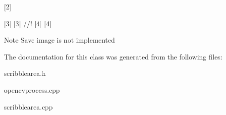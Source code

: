 \mbox{[}2\mbox{]} 

\mbox{[}3\mbox{]} \mbox{[}3\mbox{]} //! \mbox{[}4\mbox{]} \mbox{[}4\mbox{]} \begin{DoxyNote}{Note}
Save image is not implemented 
\end{DoxyNote}


The documentation for this class was generated from the following files\-:\begin{DoxyCompactItemize}
\item 
scribblearea.\-h\item 
opencvprocess.\-cpp\item 
scribblearea.\-cpp\end{DoxyCompactItemize}
